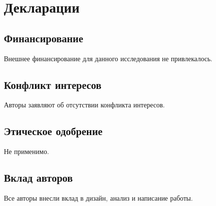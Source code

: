 \documentclass[sn-mathphys-num]{sn-jnl}
\begin{document}
\section*{Декларации}

\subsection*{Финансирование}
Внешнее финансирование для данного исследования не привлекалось.

\subsection*{Конфликт интересов}
Авторы заявляют об отсутствии конфликта интересов.

\subsection*{Этическое одобрение}
Не применимо.

\subsection*{Вклад авторов}
Все авторы внесли вклад в дизайн, анализ и написание работы.


\end{document}
